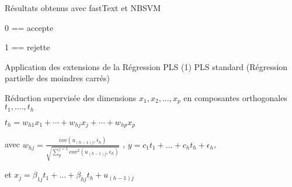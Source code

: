 \begin{frame}{Résultats obtenus avec fastText et NBSVM}
\begin{table}
\end{table}
0 == accepte

1 == rejette

\end{frame}

%
%
%
%
%

\begin{frame}{Application des extensions de la Régression PLS (1)}
PLS standard (Régression partielle des moindres carrés) 

Réduction supervisée des dimensions $x_1, x_2, ..., x_p$ en composantes orthogonales $t_1, ...., t_h$

$t_h = w_{h1} x_1 + \cdots + w_{hj} x_j + \cdots + w_{hp} x_p$

avec $w_{hj} = \frac{cov(u_{(h-1)j}, \epsilon_h)}{\sqrt{\sum_p^{j=1} cov^2(u_{(h-1)j}, \epsilon_h)}}$
, $y=c_1 t_1 + ... + c_h t_h + \epsilon_h$,

et $x_j=\beta_{1j} t_1 + ... + \beta_{hj} t_h + u_{(h-1)j}$


\end{frame}


